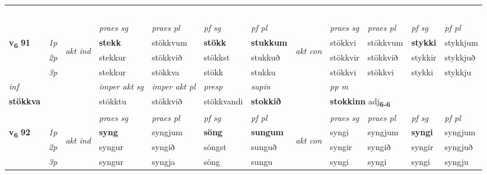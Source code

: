 \begin{longtable}[l]{X>{\footnotesize\itshape}llXXXXlXXXX}
\midrule
  & \\*
   & \\*
     & \\*
   & \\*
  & \\
   \midrule
 & &   & \textit{praes sg}  & \textit{praes pl}    & \textit{ pf sg} & \textit{pf pl} & & \textit{praes sg}  & \textit{praes pl}    & \textit{pf sg} & \textit{pf pl }  \\ \cmidrule{4-7} \cmidrule{9-12}
 \multirow{2}{*}{{{\textbf{v{\textsubscript{6}}} \Large{\textbf{91}}}}}  & 1p & \multirow{3}{*}{\begin{turn}{90}\textit{akt ind}\end{turn}} & \textbf{stekk} & stökkvum & \textbf{stökk} & \textbf{stukkum} & \multirow{3}{*}{\begin{turn}{90}\textit{akt con}\end{turn}} &stökkvi & stökkvum & \textbf{stykki} & stykkjum\\*
 & 2p &  &  stekkur  & stökkvið & stökkst & stukkuð & & stökkvir & stökkvið & stykkir & stykkjuð \\*
 & 3p &  & stekkur & stökkva & stökk & stukku & & stökkvi & stökkvi& stykki & stykkju \\*
\cmidrule{4-7} \cmidrule{9-12}

   {\textit{inf}} & &  & \textit{imper akt sg} & \textit{imper akt pl}   & \textit{presp} & \textit{supin}  && \textit{pp m} \\*
  {\textbf{stökkva}} & && stökktu  & stökkvið   & stökkvandi &  \textbf{stokkið}  && \multicolumn{2}{l}{\textbf{stokkinn} adj\textbf{\textsubscript{6-6}}} \\*

\midrule

 & &   & \textit{praes sg}  & \textit{praes pl}    & \textit{ pf sg} & \textit{pf pl} & & \textit{praes sg}  & \textit{praes pl}    & \textit{pf sg} & \textit{pf pl }  \\ \cmidrule{4-7} \cmidrule{9-12}
 \multirow{2}{*}{{{\textbf{v{\textsubscript{6}}} \Large{\textbf{92}}}}}  & 1p & \multirow{3}{*}{\begin{turn}{90}\textit{akt ind}\end{turn}} & \textbf{syng} & syngjum & \textbf{söng} & \textbf{sungum} & \multirow{3}{*}{\begin{turn}{90}\textit{akt con}\end{turn}} &syngi & syngjum & \textbf{syngi} & syngjum\\*
 & 2p &  &  syngur  & syngið & söngst & sunguð & & syngir & syngið & syngir & syngjuð \\*
 & 3p &  & syngur & syngja & söng & sungu & & syngi & syngi& syngi & syngju \\*
\cmidrule{4-7} \cmidrule{9-12}


\end{longtable}
